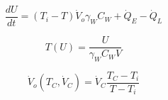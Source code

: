 \documentclass[11pt]{article} %
\begin{document}
\begin{equation} \label{eq:tankmodel}
\frac{dU}{dt} = (T_i-T) \dot{V}_o \gamma _W C_W + \dot{Q}_E - \dot{Q}_L
\end{equation}

\begin{equation} \label{eq:tempfromenergy}
T(U) = \frac{U}{\gamma _W C_W V}
\end{equation}

\begin{equation} \label{eq:flowfromcons}
\dot{V}_o (T_C,\dot{V} _C) = \dot{V} _C \frac{T_C - T_i}{T-T_i}
\end{equation}

{}

\end{document}
